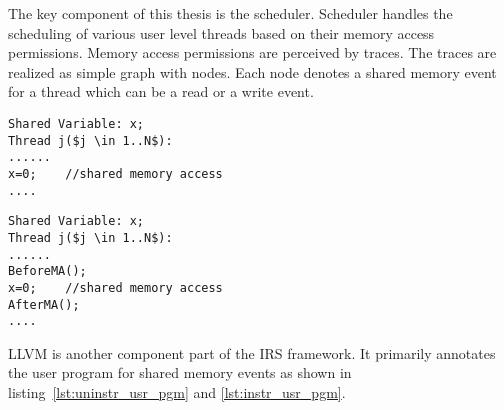 The key component of this thesis is the scheduler. 
Scheduler handles the scheduling of various user level threads based on their memory access permissions. 
Memory access permissions are perceived by traces. 
The traces are realized as simple graph with nodes. 
Each node denotes a shared memory event for a thread which can be a read or a write event. 
\\
\noindent\begin{minipage}{.45\textwidth}
\begin{lstlisting}[mathescape=true,style=customc,caption={Uninstrumented User Program},frame=tlrb,label={lst:uninstr_usr_pgm}]
Shared Variable: x;
Thread j($j \in 1..N$): 
......
x=0;	//shared memory access
....
\end{lstlisting}
\end{minipage}\hfill
\begin{minipage}{.45\textwidth}
\begin{lstlisting}[mathescape=true,style=customc,caption={Instrumented User Program},frame=tlrb,label={lst:instr_usr_pgm}]
Shared Variable: x;
Thread j($j \in 1..N$): 
......
BeforeMA();
x=0;	//shared memory access
AfterMA();
....
\end{lstlisting}
\end{minipage}

LLVM is another component part of the IRS framework. 
It primarily annotates the user program for shared memory events as shown in listing~\ref{lst:uninstr_usr_pgm} and \ref{lst:instr_usr_pgm}. 

